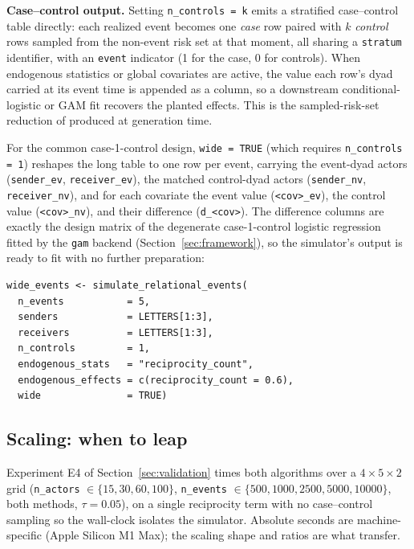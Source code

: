\textbf{Case--control output.} Setting \texttt{n\_controls = k} emits a
stratified case--control table directly: each realized event becomes one
\emph{case} row paired with $k$ \emph{control} rows sampled from the
non-event risk set at that moment, all sharing a \texttt{stratum}
identifier, with an \texttt{event} indicator (1 for the case, 0 for
controls). When endogenous statistics or global covariates are active, the
value each row's dyad carried at its event time is appended as a column,
so a downstream conditional-logistic or GAM fit recovers the planted
effects. This is the sampled-risk-set reduction of \citet{lerner2020}
produced at generation time.

For the common case-1-control design, \texttt{wide = TRUE} (which requires
\texttt{n\_controls = 1}) reshapes the long table to one row per event,
carrying the event-dyad actors (\texttt{sender\_ev},
\texttt{receiver\_ev}), the matched control-dyad actors
(\texttt{sender\_nv}, \texttt{receiver\_nv}), and for each covariate the
event value (\texttt{<cov>\_ev}), the control value (\texttt{<cov>\_nv}),
and their difference (\texttt{d\_<cov>}). The difference columns are
exactly the design matrix of the degenerate case-1-control logistic
regression fitted by the \texttt{gam} backend
(Section~\ref{sec:framework}), so the simulator's output is ready to fit
with no further preparation:

\begin{verbatim}
wide_events <- simulate_relational_events(
  n_events           = 5,
  senders            = LETTERS[1:3],
  receivers          = LETTERS[1:3],
  n_controls         = 1,
  endogenous_stats   = "reciprocity_count",
  endogenous_effects = c(reciprocity_count = 0.6),
  wide               = TRUE)
\end{verbatim}

\subsection{Scaling: when to leap}
\label{sec:sim-scaling}

Experiment E4 of Section~\ref{sec:validation} times both algorithms over a
$4 \times 5 \times 2$ grid
(\texttt{n\_actors} $\in \{15, 30, 60, 100\}$,
\texttt{n\_events} $\in \{500, 1000, 2500, 5000, 10000\}$, both methods,
$\tau = 0.05$), on a single reciprocity term with no case--control
sampling so the wall-clock isolates the simulator. Absolute seconds are
machine-specific (Apple Silicon M1 Max); the scaling shape and ratios are
what transfer.

